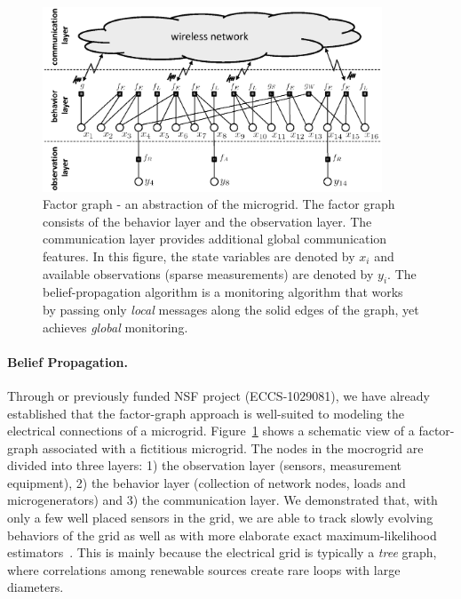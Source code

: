 \begin{figure}[t]
  \begin{center}
   \includegraphics[width=0.9\textwidth]{Bipartite.eps}
   \caption{\label{B} Factor graph - an abstraction of the microgrid.
       The factor graph consists
       of the behavior layer and the observation layer. The
       communication layer provides additional global
       communication features. In this figure, the state
       variables are denoted by $x_i$ and available observations
       (sparse measurements) are denoted by $y_i$.
       The belief-propagation algorithm is
       a monitoring algorithm that works by passing only {\em local}
       messages along the solid edges of the graph, yet achieves {\em global}
       monitoring.}
  \end{center}
\end{figure}

\paragraph{Belief Propagation.} Through or previously funded NSF project
(ECCS-1029081), we have already established that the factor-graph approach
is well-suited to modeling the electrical connections of a microgrid.
Figure~\ref{B} shows a schematic view of a factor-graph associated with a
fictitious microgrid. The nodes in the mocrogrid are divided into three
layers: 1) the observation layer (sensors, measurement equipment), 2) the
behavior layer (collection of network nodes, loads and microgenerators) and
3) the communication layer. We demonstrated that, with only a few well
placed sensors in the grid, we are able to track slowly evolving behaviors
of the grid as well as with more elaborate exact maximum-likelihood
estimators~\cite{Hu10,Hu11,Hu11a}. This is mainly because the electrical
grid is typically a {\em tree} graph, where correlations among renewable
sources create rare loops with large diameters.

